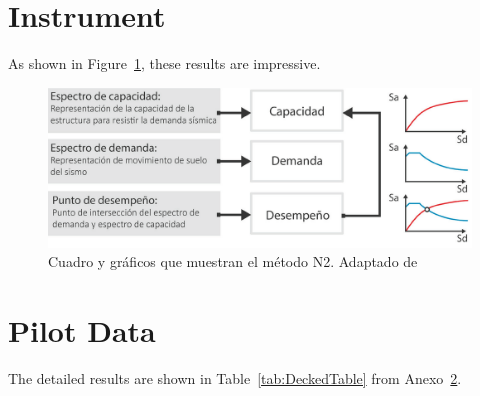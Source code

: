 \appendix

\section{Instrument}
\label{app:instrument}

As shown in Figure~\ref{fig:Figure2}, these results are impressive. \lipsum[20]

\begin{figure}[ht]
  \includegraphics[scale=0.36]{E_IMAGENES/3_Capitulo3/Cap3_Imagen70.png}
	\caption{Cuadro y gráficos que muestran el método N2. Adaptado de \cite{deWaal2009}}
	\label{fig:Figure2}
\end{figure}

\lipsum[21]

\section{Pilot Data}
\label{app:surveydata}

The detailed results are shown in Table~\ref{tab:DeckedTable} from Anexo~\ref{app:surveydata}.

\lipsum[23]

